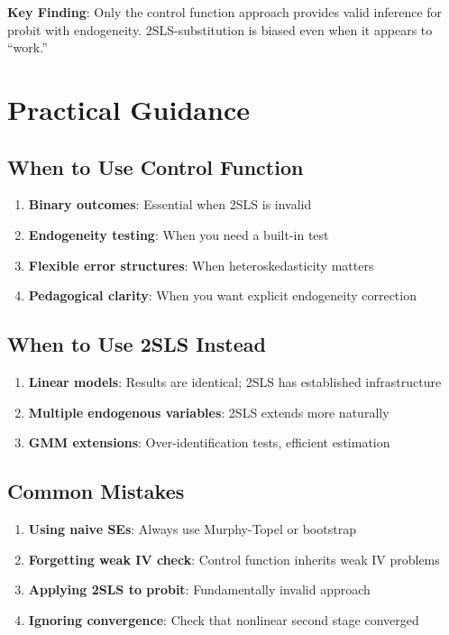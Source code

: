 \textbf{Key Finding}: Only the control function approach provides valid inference for probit with endogeneity. 2SLS-substitution is biased even when it appears to ``work.''


\section{Practical Guidance}
\label{sec:cf_practical}

\subsection{When to Use Control Function}

\begin{enumerate}
    \item \textbf{Binary outcomes}: Essential when 2SLS is invalid
    \item \textbf{Endogeneity testing}: When you need a built-in test
    \item \textbf{Flexible error structures}: When heteroskedasticity matters
    \item \textbf{Pedagogical clarity}: When you want explicit endogeneity correction
\end{enumerate}

\subsection{When to Use 2SLS Instead}

\begin{enumerate}
    \item \textbf{Linear models}: Results are identical; 2SLS has established infrastructure
    \item \textbf{Multiple endogenous variables}: 2SLS extends more naturally
    \item \textbf{GMM extensions}: Over-identification tests, efficient estimation
\end{enumerate}

\subsection{Common Mistakes}

\begin{enumerate}
    \item \textbf{Using naive SEs}: Always use Murphy-Topel or bootstrap
    \item \textbf{Forgetting weak IV check}: Control function inherits weak IV problems
    \item \textbf{Applying 2SLS to probit}: Fundamentally invalid approach
    \item \textbf{Ignoring convergence}: Check that nonlinear second stage converged
\end{enumerate}


